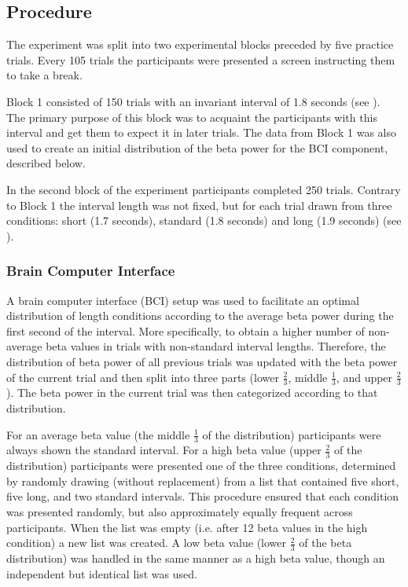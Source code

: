 \documentclass[man,floatsintext]{apa6} %
\begin{document}
\subsection{Procedure}
The experiment was split into two experimental blocks preceded by five
practice trials. Every 105 trials the participants were presented a
screen instructing them to take a break.

Block 1 consisted of 150 trials with an invariant interval of 1.8
seconds (see ). The primary purpose of this block was
to acquaint the participants with this interval and get them to expect
it in later trials. The data from Block 1 was also used to create an
initial distribution of the beta power for the BCI component,
described below.

In the second block of the experiment participants completed 250
trials. Contrary to Block 1 the interval length was not fixed, but for
each trial drawn from three conditions: short (1.7 seconds), standard
(1.8 seconds) and long (1.9 seconds) (see ).

\subsubsection{Brain Computer Interface}
A brain computer interface (BCI) setup was used to facilitate an
optimal distribution of length conditions according to the average
beta power during the first second of the interval. More specifically,
to obtain a higher number of non-average beta values in trials with
non-standard interval lengths. Therefore, the distribution of beta
power of all previous trials was updated with the beta power of the
current trial and then split into three parts (lower $\frac{2}{3}$,
middle $\frac{1}{3}$, and upper $\frac{2}{3}$). The beta power in the
current trial was then categorized according to that distribution.

For an average beta value (the middle $\frac{1}{3}$ of the
distribution) participants were always shown the standard
interval. For a high beta value (upper $\frac{2}{3}$ of the
distribution) participants were presented one of the three conditions,
determined by randomly drawing (without replacement) from a list that
contained five short, five long, and two standard intervals. This
procedure ensured that each condition was presented randomly, but also
approximately equally frequent across participants. When the list was
empty (i.e. after 12 beta values in the high condition) a new list was
created. A low beta value (lower $\frac{2}{3}$ of the beta
distribution) was handled in the same manner as a high beta value,
though an independent but identical list was used.
\end{document}
